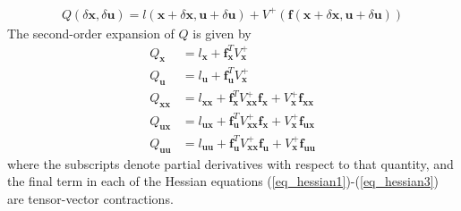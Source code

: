 \documentclass[journal ]{new-aiaa}
\newcommand{\state}{\ensuremath{\mathbf{x}}}
\newcommand{\control}{\ensuremath{\mathbf{u}}}
\begin{document}
\begin{align}
Q(\delta\state,\delta\control) = l(\state+\delta\state,\control+\delta\control) + V^+(\mathbf{f}(\state+\delta\state,\control+\delta\control))
\end{align}
The second-order expansion of $ Q $ is given by
\begin{align}
Q_\state &= l_\state + \mathbf{f}_\state^T V^+_\state \\
Q_\control &= l_\control + \mathbf{f}_\control^T V^+_\state \\
Q_{\state\state} &= l_{\state\state} + \mathbf{f}_\state^T V^+_{\state\state}\mathbf{f}_\state + V^+_\state \mathbf{f}_{\state\state} \label{eq_hessian1}\\
Q_{\control\state} &= l_{\control\state} + \mathbf{f}_\control^T V^+_{\state\state}\mathbf{f}_\state + V^+_\state \mathbf{f}_{\control\state} \label{eq_hessian2}\\
Q_{\control\control} &= l_{\control\control} + \mathbf{f}_\control^T V^+_{\state\state}\mathbf{f}_\control + V^+_\state \mathbf{f}_{\control\control} \label{eq_hessian3}
\end{align}
where the subscripts denote partial derivatives with respect to that quantity, and the final term in each of the Hessian equations (\ref{eq_hessian1})-(\ref{eq_hessian3}) are tensor-vector contractions. %
\end{document}
